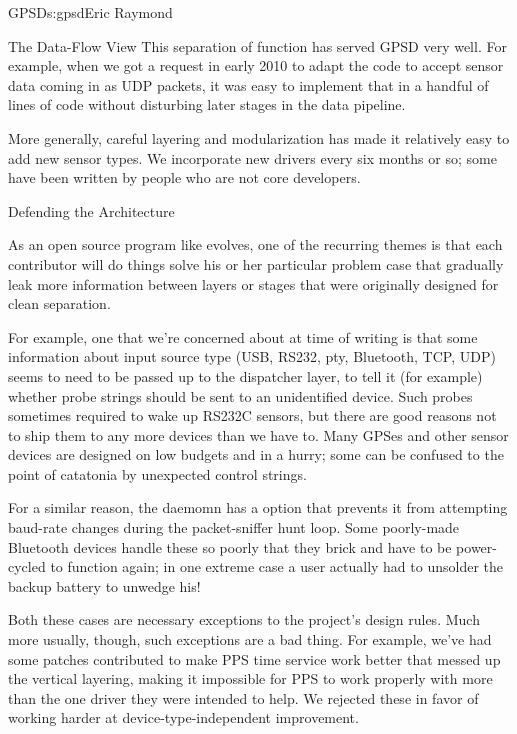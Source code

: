 \begin{aosachapter}{GPSD}{s:gpsd}{Eric Raymond}
\begin{aosasect1}{The Data-Flow View}
This separation of function has served GPSD very well. For example,
when we got a request in early 2010 to adapt the code to accept sensor
data coming in as UDP packets, it was easy to implement that in a
handful of lines of code without disturbing later stages in the data
pipeline.

More generally, careful layering and modularization has made it
relatively easy to add new sensor types.  We incorporate new drivers
every six months or so; some have been written by people who are not
core developers.

\end{aosasect1}

\begin{aosasect1}{Defending the Architecture}

As an open source program like  evolves, one of the
recurring themes is that each contributor will do things solve his or
her particular problem case that gradually leak more information
between layers or stages that were originally designed for clean
separation.

For example, one that we're concerned about at time of writing is that
some information about input source type (USB, RS232, pty, Bluetooth,
TCP, UDP) seems to need to be passed up to the dispatcher layer, to
tell it (for example) whether probe strings should be sent to an
unidentified device. Such probes sometimes required to wake up RS232C
sensors, but there are good reasons not to ship them to any more
devices than we have to. Many GPSes and other sensor devices are
designed on low budgets and in a hurry; some can be confused to the
point of catatonia by unexpected control strings.

For a similar reason, the daemomn has a  option that prevents 
it from attempting baud-rate changes  during the packet-sniffer
hunt loop.  Some poorly-made Bluetooth devices handle these so poorly
that they brick and have to be power-cycled to function again; in one
extreme case a user actually had to unsolder the backup battery to
unwedge his!

Both these cases are necessary exceptions to the project's design
rules.  Much more usually, though, such exceptions are a bad thing.
For example, we've had some patches contributed to make PPS time
service work better that messed up the vertical layering, making it
impossible for PPS to work properly with more than the one driver they
were intended to help. We rejected these in favor of working harder
at device-type-independent improvement.


\end{aosasect1}
\end{aosachapter}
